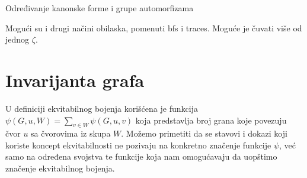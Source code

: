 \documentclass[12pt,oneside]{memoir}
\theoremstyle{definition}
\begin{document}
  \begin{algorithm}[H]
	  \caption{Određivanje kanonske forme i grupe automorfizama}
	  \begin{algorithmic}[1]
			\State \Return {$|\nu|$}
		  \EndIf
					\State {}
				\EndIf
			\EndIf
		  \EndFor
				\State {$\rho \gets \nu$}
			\EndIf

			\If {$\zeta = ()$}
				\State {$\zeta \gets \nu$}
			\EndIf

			\EndIf
					\State {}
				\EndIf
				\State {}
			\EndIf

		  \EndIf
		  \State \Return{$|\nu|$}
		  \EndProcedure
	  \end{algorithmic}
  \end{algorithm}

  {\color{red} Mogući su i drugi načini obilaska, pomenuti bfs i traces. Moguće je čuvati više od jednog $\zeta$.}

 \section{Invarijanta grafa}

  U definiciji ekvitabilnog bojenja korišćena je funkcija $\psi(G, u, W) =
  \sum_{v \in W} \psi(G, u, v)$ koja predstavlja broj grana koje povezuju čvor
  $u$ sa čvorovima iz skupa $W$. Možemo primetiti da se stavovi i dokazi koji
  koriste koncept ekvitabilnosti ne pozivaju na konkretno značenje funkcije
  $\psi$, već samo na određena svojstva te funkcije koja nam omogućavaju da
  uopštimo značenje ekvitabilnog bojenja.
\end{document}
